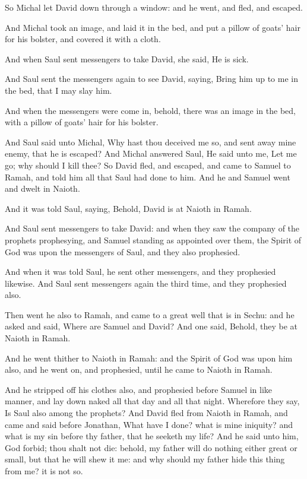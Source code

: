 \Verse So Michal let David down through a window: and he went, and fled, and escaped.

\Verse And Michal took an image, and laid it in the bed, and put a pillow of goats' hair for his bolster, and covered it with a cloth.

\Verse And when Saul sent messengers to take David, she said, He is sick.

\Verse And Saul sent the messengers again to see David, saying, Bring him up to me in the bed, that I may slay him.

\Verse And when the messengers were come in, behold, there was an image in the bed, with a pillow of goats' hair for his bolster.

\Verse And Saul said unto Michal, Why hast thou deceived me so, and sent away mine enemy, that he is escaped? And Michal answered Saul, He said unto me, Let me go; why should I kill thee?  \Verse So David fled, and escaped, and came to Samuel to Ramah, and told him all that Saul had done to him. And he and Samuel went and dwelt in Naioth.

\Verse And it was told Saul, saying, Behold, David is at Naioth in Ramah.

\Verse And Saul sent messengers to take David: and when they saw the company of the prophets prophesying, and Samuel standing as appointed over them, the Spirit of God was upon the messengers of Saul, and they also prophesied.

\Verse And when it was told Saul, he sent other messengers, and they prophesied likewise. And Saul sent messengers again the third time, and they prophesied also.

\Verse Then went he also to Ramah, and came to a great well that is in Sechu: and he asked and said, Where are Samuel and David? And one said, Behold, they be at Naioth in Ramah.

\Verse And he went thither to Naioth in Ramah: and the Spirit of God was upon him also, and he went on, and prophesied, until he came to Naioth in Ramah.

\Verse And he stripped off his clothes also, and prophesied before Samuel in like manner, and lay down naked all that day and all that night. Wherefore they say, Is Saul also among the prophets?  
\Chapter
\Verse And David fled from Naioth in Ramah, and came and said before Jonathan, What have I done? what is mine iniquity? and what is my sin before thy father, that he seeketh my life?  \Verse And he said unto him, God forbid; thou shalt not die: behold, my father will do nothing either great or small, but that he will shew it me: and why should my father hide this thing from me? it is not so.

